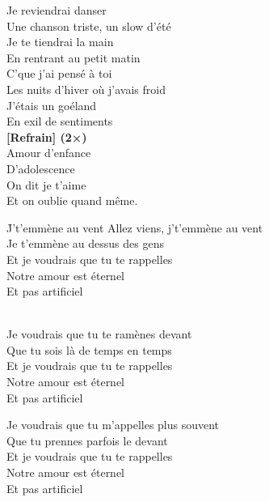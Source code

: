 \documentclass{novel}
\begin{document}
Je reviendrai danser \\
Une chanson triste, un slow d'été \\
Je te tiendrai la main \\
En rentrant au petit matin \\
C'que j'ai pensé à toi \\
Les nuits d'hiver où j'avais froid \\
J'étais un goéland \\
En exil de sentiments \\

\textbf{[Refrain] (2×)}\\

Amour d'enfance \\
D'adolescence \\
On dit je t'aime \\
Et on oublie quand même.

\newpage
\normalsize

\h*{J’t’emmène au vent}
Allez viens, j't'emmène au vent \\
Je t'emmène au dessus des gens \\
Et je voudrais que tu te rappelles \\
Notre amour est éternel \\
Et pas artificiel \\

\begin{bfseries}
[Refrain:]\\
Je voudrais que tu te ramènes devant \\
Que tu sois là de temps en temps \\
Et je voudrais que tu te rappelles \\
Notre amour est éternel \\
Et pas artificiel \\
\end{bfseries}

Je voudrais que tu m'appelles plus souvent \\
Que tu prennes parfois le devant \\
Et je voudrais que tu te rappelles \\
Notre amour est éternel \\
Et pas artificiel \\
\end{document}
